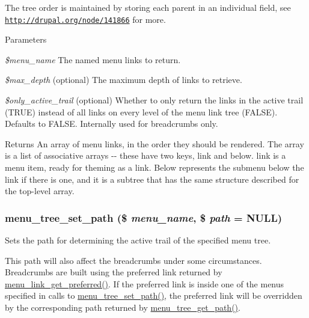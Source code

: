 The tree order is maintained by storing each parent in an individual field, see \href{http://drupal.org/node/141866}{\tt http://drupal.org/node/141866} for more.


\begin{DoxyParams}{Parameters}
\item[{\em \$menu\_\-name}]The named menu links to return. \item[{\em \$max\_\-depth}](optional) The maximum depth of links to retrieve. \item[{\em \$only\_\-active\_\-trail}](optional) Whether to only return the links in the active trail (TRUE) instead of all links on every level of the menu link tree (FALSE). Defaults to FALSE. Internally used for breadcrumbs only.\end{DoxyParams}
\begin{DoxyReturn}{Returns}
An array of menu links, in the order they should be rendered. The array is a list of associative arrays -\/-\/ these have two keys, link and below. link is a menu item, ready for theming as a link. Below represents the submenu below the link if there is one, and it is a subtree that has the same structure described for the top-\/level array. 
\end{DoxyReturn}
\hypertarget{group__menu_gacbb655f92275e3c823637edbd9441cdd}{
\subsubsection[{menu\_\-tree\_\-set\_\-path}]{\setlength{\rightskip}{0pt plus 5cm}menu\_\-tree\_\-set\_\-path (\$ {\em menu\_\-name}, \/  \$ {\em path} = {\ttfamily NULL})}}
\label{group__menu_gacbb655f92275e3c823637edbd9441cdd}
Sets the path for determining the active trail of the specified menu tree.

This path will also affect the breadcrumbs under some circumstances. Breadcrumbs are built using the preferred link returned by \hyperlink{group__menu_gad5fbd7dfd77f1496d636d130a3ff591d}{menu\_\-link\_\-get\_\-preferred()}. If the preferred link is inside one of the menus specified in calls to \hyperlink{group__menu_gacbb655f92275e3c823637edbd9441cdd}{menu\_\-tree\_\-set\_\-path()}, the preferred link will be overridden by the corresponding path returned by \hyperlink{group__menu_ga719b18e6d93314528b8726b333f300c0}{menu\_\-tree\_\-get\_\-path()}.

